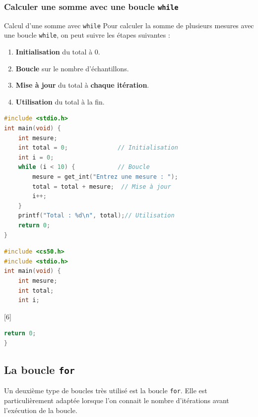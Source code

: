 \subsubsection{Calculer une somme avec une boucle \texttt{while}}
\begin{UPSTIinfor}{Calcul d'une somme avec \texttt{while}}
  Pour calculer la somme de plusieurs mesures avec une boucle \texttt{while}, on peut suivre les étapes suivantes :
  \begin{minipage}{0.45\textwidth}
    \begin{enumerate}
      \item \textbf{Initialisation} du total à 0.
      \item \textbf{Boucle} sur le nombre d'échantillons.
      \item \textbf{Mise à jour} du total à \textbf{chaque itération}.
      \item \textbf{Utilisation} du total à la fin.
    \end{enumerate}
  \end{minipage}\hfill%
  \begin{minipage}{0.5\textwidth}
    \ifnum{}
        \begin{lstlisting}[language=c,caption={Calcul d'une somme}]
#include <stdio.h>
int main(void) {
    int mesure;
    int total = 0;              // Initialisation
    int i = 0;
    while (i < 10) {            // Boucle
        mesure = get_int("Entrez une mesure : ");
        total = total + mesure;  // Mise à jour
        i++;
    }
    printf("Total : %d\n", total);// Utilisation
    return 0;
}
\end{lstlisting}%
    \else
\begin{lstlisting}[language=c,numbers=none]
#include <cs50.h>
#include <stdio.h>
int main(void) {
    int mesure;
    int total;
    int i;
        \end{lstlisting}%
    \begin{center}
      [6]
    \end{center}
        \begin{lstlisting}[language=c,numbers=none,caption={Calcul d'une somme}]
    return 0;
}
\end{lstlisting}%
    \fi
  \end{minipage}
\end{UPSTIinfor}

\subsection{La boucle \texttt{for}}
Un deuxième type de boucles très utilisé est la boucle \texttt{for}. Elle est particulièrement adaptée lorsque l'on connait le nombre d'itérations avant l'exécution de la boucle.

